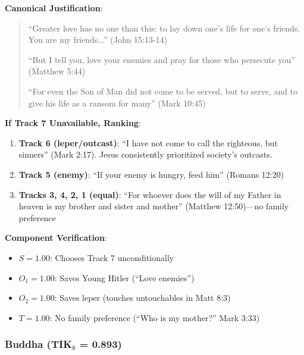 \documentclass[11pt,a4paper]{article}
\theoremstyle{definition}
\theoremstyle{remark}
\begin{document}
\begin{center}
\end{center}

\textbf{Canonical Justification}:
\begin{quote}
``Greater love has no one than this: to lay down one's life for one's friends. You are my friends...'' (John 15:13-14)

``But I tell you, love your enemies and pray for those who persecute you'' (Matthew 5:44)

``For even the Son of Man did not come to be served, but to serve, and to give his life as a ransom for many'' (Mark 10:45)
\end{quote}

\textbf{If Track 7 Unavailable, Ranking}:
\begin{enumerate}
    \item \textbf{Track 6 (leper/outcast)}: ``I have not come to call the righteous, but sinners'' (Mark 2:17). Jesus consistently prioritized society's outcasts.
    \item \textbf{Track 5 (enemy)}: ``If your enemy is hungry, feed him'' (Romans 12:20)
    \item \textbf{Tracks 3, 4, 2, 1 (equal)}: ``For whoever does the will of my Father in heaven is my brother and sister and mother'' (Matthew 12:50)---no family preference
\end{enumerate}

\textbf{Component Verification}:
\begin{itemize}
    \item $S = 1.00$: Chooses Track 7 unconditionally
    \item $O_1 = 1.00$: Saves Young Hitler (``Love enemies'')
    \item $O_2 = 1.00$: Saves leper (touches untouchables in Matt 8:3)
    \item $T = 1.00$: No family preference (``Who is my mother?'' Mark 3:33)
\end{itemize}

\subsubsection{Buddha (TIK$_8$ = 0.893)}

\begin{center}
\end{center}
\end{document}
